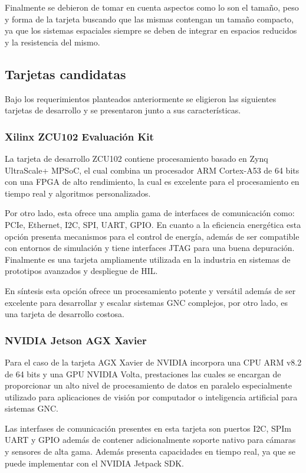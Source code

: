 Finalmente se debieron de tomar en cuenta aspectos como lo son el tamaño, peso y forma de la tarjeta buscando que las mismas contengan un tamaño compacto, ya que los sistemas espaciales siempre se deben de integrar en espacios reducidos y la resistencia del mismo.

\subsection{Tarjetas candidatas}
Bajo los requerimientos planteados anteriormente se eligieron las siguientes tarjetas de desarrollo y se presentaron junto a sus características.

\subsubsection{Xilinx ZCU102 Evaluación Kit}

La tarjeta de desarrollo ZCU102 contiene procesamiento basado en Zynq UltraScale+ MPSoC, el cual combina un procesador ARM Cortex-A53 de 64 bits con una FPGA de alto rendimiento, la cual es excelente para el procesamiento en tiempo real y algoritmos personalizados.

Por otro lado, esta ofrece una amplia gama de interfaces de comunicación como: PCIe, Ethernet, I2C, SPI, UART, GPIO. En cuanto a la eficiencia energética esta opción presenta mecanismos para el control de energía, además de ser compatible con entornos de simulación y tiene interfaces JTAG para una buena depuración. Finalmente es una tarjeta ampliamente utilizada en la industria en sistemas de prototipos avanzados y despliegue de HIL.

En síntesis esta opción ofrece un procesamiento potente y versátil además de ser excelente para desarrollar y escalar sistemas GNC complejos, por otro lado, es una tarjeta de desarrollo costosa.

\subsubsection{NVIDIA Jetson AGX Xavier}

Para el caso de la tarjeta AGX Xavier de NVIDIA incorpora una CPU ARM v8.2 de 64 bits y una GPU NVIDIA Volta, prestaciones las cuales se encargan de proporcionar un alto nivel de procesamiento de datos en paralelo especialmente utilizado para aplicaciones de visión por computador o inteligencia artificial para sistemas GNC. 

Las interfases de comunicación presentes en esta tarjeta son puertos I2C, SPIm UART y GPIO además de contener adicionalmente soporte nativo para cámaras y sensores de alta gama. Además presenta capacidades en tiempo real, ya que se puede implementar con el NVIDIA Jetpack SDK. 

